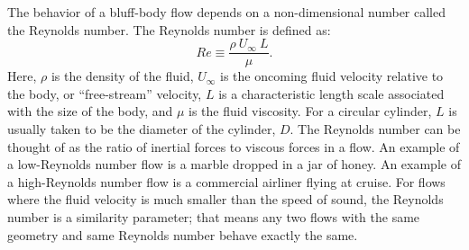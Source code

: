 \documentclass{article}
\begin{document}
The behavior of a bluff-body flow depends on a non-dimensional number
called the Reynolds number.  The Reynolds number is defined as:
\begin{equation}
Re \equiv \frac{\rho~U_\infty~L}{\mu}.
\end{equation}
Here, $\rho$ is the density of the fluid, $U_\infty$ is the oncoming 
fluid velocity relative to the body, or ``free-stream'' velocity, $L$
is a characteristic length scale associated with the size of the body,
and $\mu$ is the fluid viscosity.  For a circular cylinder, $L$ is
usually taken to be the diameter of the cylinder, $D$.  The Reynolds number
can be thought of as the ratio of inertial forces to viscous forces in
a flow.  An example of a low-Reynolds number flow is a marble
dropped in a jar of honey.  An example of a high-Reynolds number flow
is a commercial airliner flying at cruise.  For flows where the
fluid velocity is much smaller than the speed of sound, the Reynolds
number is a similarity parameter; that means any two flows with the
same geometry and same Reynolds number behave exactly the same.
\end{document}
